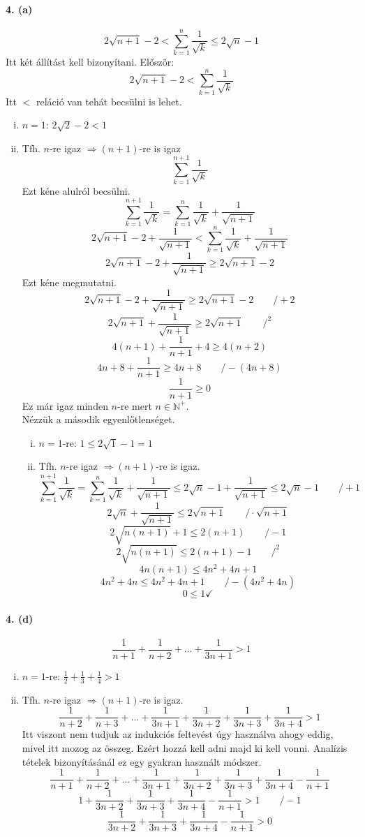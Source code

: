 \documentclass[12pt,a4paper,fleqn]{article}
\newcommand{\myparagraph}[1]{\paragraph{#1}\mbox{}}
\begin{document}
\myparagraph{4. (a)}
\[ 2\sqrt{n+1} - 2 < \sum_{k=1}^{n} \dfrac{1}{\sqrt{k}} \leq 2\sqrt{n}-1 \]
Itt két állítást kell bizonyítani. Először:
\[ 2 \sqrt{n+1} - 2 < \sum_{k=1}^{n} \dfrac{1}{\sqrt{k}} \]
Itt $<$ reláció van tehát becsülni is lehet.
\begin{enumerate}[i.]
  \item $n=1$: $2 \sqrt{2}-2 < 1$ \checkmark
  \item Tfh. $n$-re igaz $\Rightarrow (n+1)$-re is igaz
  \[\sum_{k=1}^{n+1} \dfrac{1}{\sqrt{k}} \]
  Ezt kéne alulról becsülni.
  \[ \sum_{k=1}^{n+1} \dfrac{1}{\sqrt{k}} = \sum_{k=1}^{n} \dfrac{1}{\sqrt{k}}
    + \dfrac{1}{\sqrt{n+1}}
  \]
  \[ 2\sqrt{n+1} - 2 + \dfrac{1}{\sqrt{n+1}} < \sum_{k=1}^{n} \dfrac{1}{\sqrt{k}}
    + \dfrac{1}{\sqrt{n+1}}
  \]
  \[ 2\sqrt{n+1} - 2 + \dfrac{1}{\sqrt{n+1}} \geq 2\sqrt{n+1} - 2 \]
  Ezt kéne megmutatni.
  \[ 2\sqrt{n+1} - 2 + \dfrac{1}{\sqrt{n+1}} \geq 2\sqrt{n+1} - 2 \qquad /+2 \]
  \[ 2\sqrt{n+1} + \dfrac{1}{\sqrt{n+1}} \geq 2\sqrt{n+1} \qquad /^2 \]
  \[ 4(n+1) + \dfrac{1}{n+1} + 4 \geq 4(n+2) \]
  \[ 4n+8+\dfrac{1}{n+1} \geq 4n+8 \qquad /-(4n+8)\]
  \[ \dfrac{1}{n+1} \geq 0 \]
  Ez már igaz minden $n$-re mert $n \in \mathbb{N}^{+}$. \\
  Nézzük a második egyenlőtlenséget.
  \begin{enumerate}[i.]
    \item $n=1$-re: $1 \leq 2\sqrt{1}-1 = 1$ \checkmark
    \item Tfh. $n$-re igaz $\Rightarrow (n+1)$-re is igaz.
    \[ \sum_{k=1}^{n+1} \dfrac{1}{\sqrt{k}} = \sum_{k=1}^{n} \dfrac{1}{\sqrt{k}}
      + \dfrac{1}{\sqrt{n+1}} \leq 2\sqrt{n}-1 + \dfrac{1}{\sqrt{n+1}}
      \leq 2\sqrt{n}-1 \qquad /+1
    \]
    \[ 2\sqrt{n} + \dfrac{1}{\sqrt{n+1}} \leq 2\sqrt{n+1} \qquad /
      \cdot \sqrt{n+1} \]
    \[ 2\sqrt{n(n+1)} + 1 \leq 2(n+1) \qquad /-1 \]
    \[ 2\sqrt{n(n+1)} \leq 2(n+1) -1 \qquad /^2 \]
    \[ 4n(n+1) \leq 4n^2+4n+1 \]
    \[ 4n^2+4n \leq 4n^2+4n+1 \qquad /-(4n^2+4n)\]
    \[ 0 \leq 1 \checkmark \]
  \end{enumerate}

\end{enumerate}


\myparagraph{4. (d)}
\[ \dfrac{1}{n+1} + \dfrac{1}{n+2} + ... + \dfrac{1}{3n+1} > 1 \]
\begin{enumerate}[i.]
  \item $n=1$-re: $\frac{1}{2} + \frac{1}{3} + \frac{1}{4} > 1 $ \checkmark
  \item Tfh. $n$-re igaz $\Rightarrow (n+1)$-re is igaz.
  \[ \dfrac{1}{n+2} + \dfrac{1}{n+3} + ... + \dfrac{1}{3n+1} + \dfrac{1}{3n+2}
    + \dfrac{1}{3n+3} + \dfrac{1}{3n+4} > 1
  \]
  Itt viszont nem tudjuk az indukciós feltevést úgy használva ahogy eddig, mivel
  itt mozog az összeg. Ezért hozzá kell adni majd ki kell vonni. Analízis tételek
  bizonyításánál ez egy gyakran használt módszer.
  \[ \dfrac{1}{n+1} + \dfrac{1}{n+2} + ... + \dfrac{1}{3n+1} + \dfrac{1}{3n+2}
    + \dfrac{1}{3n+3} + \dfrac{1}{3n+4} - \dfrac{1}{n+1}
  \]
  \[ 1 + \dfrac{1}{3n+2} + \dfrac{1}{3n+3} + \dfrac{1}{3n+4} - \dfrac{1}{n+1}
    > 1 \qquad /-1 \]
  \[ \dfrac{1}{3n+2} + \dfrac{1}{3n+3} + \dfrac{1}{3n+4} - \dfrac{1}{n+1} > 0 \]
\end{enumerate}
\end{document}
